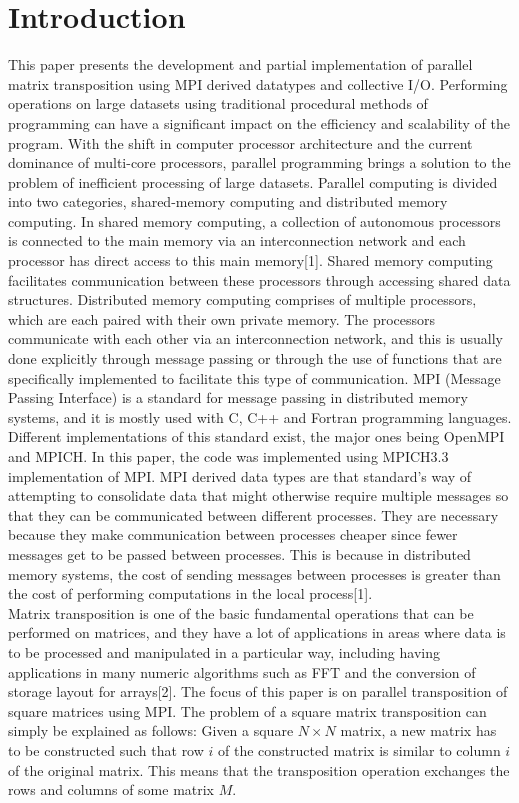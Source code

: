 \documentclass[journal]{IEEEtran}
\begin{document}
\section{Introduction}

\noindent
This paper presents the development and partial implementation of parallel matrix transposition using MPI derived datatypes and collective I/O. Performing operations on large datasets using traditional procedural methods of programming can have a significant impact on the efficiency and scalability of the program. With the shift in computer processor architecture and the current dominance of multi-core processors, parallel programming brings a solution to the problem of inefficient processing of large datasets. Parallel computing is divided into two categories, shared-memory computing and distributed memory computing. In shared memory computing, a collection of autonomous processors is connected to the main memory via an interconnection network and each processor has direct access to this main memory[1]. Shared memory computing facilitates communication between these processors through accessing shared data structures. Distributed memory computing comprises of multiple processors, which are each paired with their own private memory. The processors communicate with each other via an interconnection network, and this is usually done explicitly through message passing or through the use of functions that are specifically implemented to facilitate this type of communication. MPI (Message Passing Interface) is a standard for message passing in distributed memory systems, and it is mostly used with C, C++ and Fortran programming languages. Different implementations of this standard exist, the major ones being OpenMPI and MPICH. In this paper, the code was implemented using MPICH3.3 implementation of MPI. MPI derived data types are that standard's way of attempting to consolidate data that might otherwise require multiple messages so that they can be communicated between different processes. They are necessary because they make communication between processes cheaper since fewer messages get to be passed between processes. This is because in distributed memory systems, the cost of sending messages between processes is greater than the cost of performing computations in the local process[1].
\\

\noindent
Matrix transposition is one of the basic fundamental operations that can be performed on matrices, and they have a lot of applications in areas where data is to be processed and manipulated in a particular way, including having applications in many numeric algorithms such as FFT and the conversion of storage layout for arrays[2]. The focus of this paper is on parallel transposition of square matrices using MPI. The problem of a square matrix transposition can simply be explained as follows: Given a square $N\times N$ matrix, a new matrix has to be constructed such that row $i$ of the constructed matrix is similar to column $i$ of the original matrix. This means that the transposition operation exchanges the rows and columns of some matrix $M$. 
\end{document}
